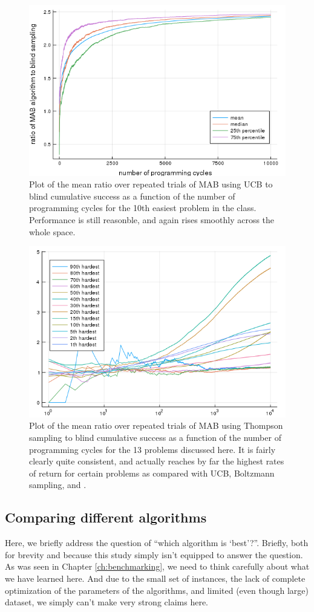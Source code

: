 \begin{figure}
    \includegraphics[width=0.8\columnwidth]{thompson_inst13_air.png}
    \caption{Plot of the mean ratio over repeated trials of MAB using UCB to blind cumulative success as a function of the number of programming cycles for the 10th easiest problem in the class. Performance is still reasonble, and again rises smoothly across the whole space.}
    \label{fig:thompson_inst13_air}
\end{figure}

\begin{figure}
    \includegraphics[width=0.8\columnwidth]{thompson_air_mabratio_mean.png}
    \caption{Plot of the mean ratio over repeated trials of MAB using Thompson sampling to blind cumulative success as a function of the number of programming cycles for the 13 problems discussed here. It is fairly clearly quite consistent, and actually reaches by far the highest rates of return for certain problems as compared with UCB, Boltzmann sampling, and \eg.}
    \label{fig:thompson_air_mabratio_mean}
\end{figure}

\subsection{Comparing different algorithms}
Here, we briefly address the question of ``which algorithm is `best'?''. Briefly, both for brevity and because this study simply isn't equipped to answer the question. As was seen in Chapter \ref{ch:benchmarking}, we need to think carefully about what we have learned here. And due to the small set of instances, the lack of complete optimization of the parameters of the algorithms, and limited (even though large) dataset, we simply can't make very strong claims here.

